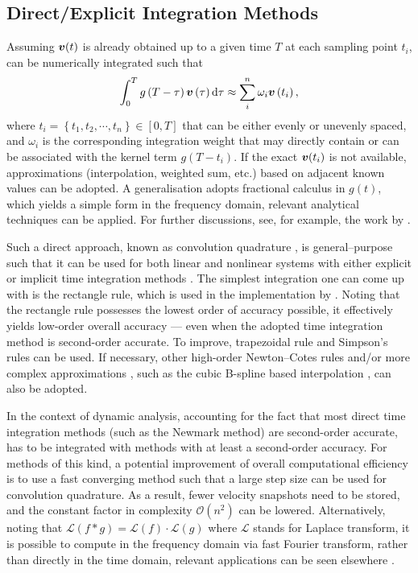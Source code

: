 \subsection{Direct/Explicit Integration Methods}
Assuming $\bm{v}(t)$ is already obtained up to a given time $T$ at each sampling point $t_i$,  can be numerically integrated such that
\begin{gather}
\int_0^Tg\left(T-\tau\right)\bm{v}\left(\tau\right)\mathrm{d}\tau\approx\sum_i^n\omega_i\bm{v}\left(t_i\right),
\end{gather}
where $t_i=\left\{t_1,t_2,\cdots,t_n\right\}\in[0,T]$ that can be either evenly or unevenly spaced, and $\omega_i$ is the corresponding integration weight that may directly contain or can be associated \citep{Schaedle2006} with the kernel term $g\left(T-t_i\right)$. If the exact $\bm{v}(t_i)$ is not available, approximations (interpolation, weighted sum, etc.) based on adjacent known values can be adopted. A generalisation adopts fractional calculus \citep[e.g.,][]{Bagley1983,Gaul1999} in $g(t)$, which yields a simple form in the frequency domain, relevant analytical techniques can be applied. For further discussions, see, for example, the work by \citet{Fernandez2019}.

Such a direct approach, known as convolution quadrature \citep[see][and the references therein]{Lubich2004}, is general--purpose such that it can be used for both linear and nonlinear systems with either explicit or implicit time integration methods \citep[see, e.g.,][]{Katsikadelis2019}. The simplest integration one can come up with is the rectangle rule, which is used in the implementation by \citet{Puthanpurayil2014}. Noting that the rectangle rule possesses the lowest order of accuracy possible, it effectively yields low-order overall accuracy --- even when the adopted time integration method is second-order accurate. To improve, trapezoidal rule \citep[e.g.,][]{Liu2014} and Simpson's rules \citep[e.g.,][]{Shen2019} can be used. If necessary, other high-order Newton--Cotes rules and/or more complex approximations \citep{Schaedle2006,Shen2021}, such as the cubic B-spline based interpolation \citep{Liu2023a,Liu2023b}, can also be adopted.

In the context of dynamic analysis, accounting for the fact that most direct time integration methods (such as the Newmark method) are second-order accurate,  has to be integrated with methods with at least a second-order accuracy. For methods of this kind, a potential improvement of overall computational efficiency is to use a fast converging method \citep{Schaedle2006} such that a large step size can be used for convolution quadrature. As a result, fewer velocity snapshots need to be stored, and the constant factor in complexity $\mathcal{O}\left(n^2\right)$ can be lowered.
Alternatively, noting that $\mathcal{L}\left(f*g\right)=\mathcal{L}\left(f\right)\cdot\mathcal{L}\left(g\right)$ where $\mathcal{L}$ stands for Laplace transform, it is possible to compute  in the frequency domain via fast Fourier transform, rather than directly in the time domain, relevant applications can be seen elsewhere \citep{Pan2013,Zhao2019}.


